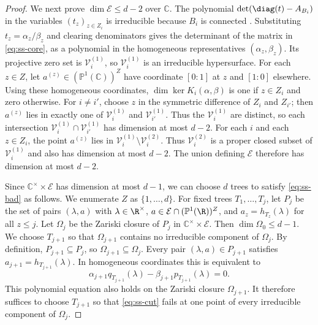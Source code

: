 \begin{proof}
We next prove $\dim\mathcal E\le d-2$ over $\mathbb C$.
The polynomial $\det(\diag(t)-A_{B_i})$ in the variables $(t_z)_{z\in Z_i}$
is irreducible because $B_i$ is connected
\cite[Lemma~4.1]{AlAhmadieh2026}.
Substituting $t_z=\alpha_z/\beta_z$ and clearing denominators gives the
determinant of the matrix in \cref{eq:ss-core}, as a polynomial in the
homogeneous representatives $(\alpha_z,\beta_z)$.
Its projective zero set is $\mathcal V_i^{(1)}$, so
$\mathcal V_i^{(1)}$ is an irreducible hypersurface.
For each $z\in Z$, let $a^{(z)}\in(\mathbb P^1(\mathbb C))^Z$ have
coordinate $[0:1]$ at $z$ and $[1:0]$ elsewhere.
Using these homogeneous coordinates, $\dim\ker K_i(\alpha,\beta)$ is one
if $z\in Z_i$ and zero otherwise.
For $i\ne i'$, choose $z$ in the symmetric difference of $Z_i$ and
$Z_{i'}$; then $a^{(z)}$ lies in exactly one of $\mathcal V_i^{(1)}$ and
$\mathcal V_{i'}^{(1)}$.
Thus the $\mathcal V_i^{(1)}$ are distinct, so each intersection
$\mathcal V_i^{(1)}\cap \mathcal V_{i'}^{(1)}$ has dimension at most $d-2$.
For each $i$ and each $z\in Z_i$, the point $a^{(z)}$ lies in
$\mathcal V_i^{(1)}\setminus\mathcal V_i^{(2)}$.
Thus $\mathcal V_i^{(2)}$ is a proper closed subset of
$\mathcal V_i^{(1)}$ and also has dimension at most $d-2$.
The union defining $\mathcal E$ therefore has dimension at most $d-2$.

Since $\mathbb C^\times\times\mathcal E$ has dimension at most $d-1$,
we can choose $d$ trees to satisfy \cref{eq:ss-bad} as follows.
We enumerate $Z$ as $\{1,\ldots,d\}$.
For fixed trees $T_1,\ldots,T_j$, let $P_j$ be the set of pairs
$(\lambda,a)$ with $\lambda\in\R^\times$,
$a\in\mathcal E\cap(\mathbb P^1(\R))^Z$, and
$a_z=h_{T_z}(\lambda)$ for all $z\le j$.
Let $\Omega_j$ be the Zariski closure of $P_j$ in
$\mathbb C^\times\times\mathcal E$.
Then $\dim\Omega_0\le d-1$.
We choose $T_{j+1}$ so that $\Omega_{j+1}$ contains no irreducible
component of $\Omega_j$.
By definition, $P_{j+1}\subseteq P_j$, so $\Omega_{j+1}\subseteq\Omega_j$.
Every pair $(\lambda,a)\in P_{j+1}$ satisfies
$a_{j+1}=h_{T_{j+1}}(\lambda)$. In homogeneous coordinates this is
equivalent to
\begin{equation}\label{eq:ss-cut}
 \alpha_{j+1}q_{T_{j+1}}(\lambda)-\beta_{j+1}p_{T_{j+1}}(\lambda)=0.
\end{equation}
This polynomial equation also holds on the Zariski closure
$\Omega_{j+1}$.
It therefore suffices to choose $T_{j+1}$ so that \cref{eq:ss-cut}
fails at one point of every irreducible component of $\Omega_j$.


\end{proof}
